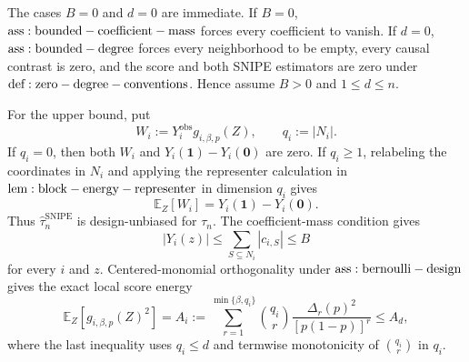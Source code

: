 The cases \(B=0\) and \(d=0\) are immediate. If \(B=0\), \({\rm ass:bounded-coefficient-mass}\) forces every coefficient to vanish. If \(d=0\), \({\rm ass:bounded-degree}\) forces every neighborhood to be empty, every causal contrast is zero, and the score and both SNIPE estimators are zero under \({\rm def:zero-degree-conventions}\). Hence assume \(B>0\) and \(1\le d\le n\).

For the upper bound, put
\[
W_i:=Y_i^{\mathrm{obs}}g_{i,\beta,p}(Z),
\qquad q_i:=|N_i|.
\]
If \(q_i=0\), then both \(W_i\) and \(Y_i(\mathbf1)-Y_i(\mathbf0)\) are zero. If \(q_i\ge1\), relabeling the coordinates in \(N_i\) and applying the representer calculation in \({\rm lem:block-energy-representer}\) in dimension \(q_i\) gives
\[
\mathbb E_Z[W_i]=Y_i(\mathbf1)-Y_i(\mathbf0).
\]
Thus \(\widehat\tau_n^{\mathrm{SNIPE}}\) is design-unbiased for \(\tau_n\). The coefficient-mass condition gives
\[
|Y_i(z)|\le\sum_{S\subseteq N_i}|c_{i,S}|\le B
\]
for every \(i\) and \(z\). Centered-monomial orthogonality under \({\rm ass:bernoulli-design}\) gives the exact local score energy
\[
\mathbb E_Z[g_{i,\beta,p}(Z)^2]
=A_i:=\sum_{r=1}^{\min\{\beta,q_i\}}\binom{q_i}{r}
\frac{\Delta_r(p)^2}{[p(1-p)]^r}
\le A_d,
\]
where the last inequality uses \(q_i\le d\) and termwise monotonicity of \(\binom{q_i}{r}\) in \(q_i\).

